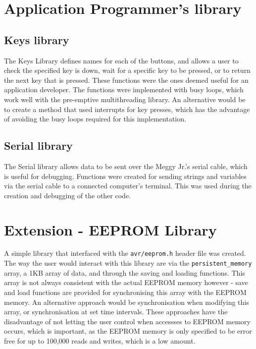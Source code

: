 \documentclass[pdftex,twoside,a4paper]{article}
\begin{document}
\section*{Application Programmer's library}
\subsection*{Keys library}
The Keys Library defines names for each of the buttons, and allows a user to check the specified key is down, wait for a specific key to be pressed, or to return the next key that is pressed. These functions were the ones deemed useful for an application developer.  The functions were implemented with busy loops, which work well with the pre-emptive multithreading library. An alternative would be to create a method that used interrupts for key presses, which has the advantage of avoiding the busy loops required for this implementation.
\subsection*{Serial library}
The Serial library allows data to be sent over the Meggy Jr.'s serial cable, which is useful for debugging. Functions were created for sending strings and variables via the serial cable to a connected computer's terminal. This was used during the creation and debugging of the other code.

\section*{Extension - EEPROM Library}
A simple library that interfaced with the \texttt{avr/eeprom.h} header file was created. The way the user would interact with this library are via the \texttt{persistent\_memory} array, a 1KB array of data, and through the saving and loading functions. This array is not always consistent with the actual EEPROM memory however - save and load functions are provided for synchronising this array with the EEPROM memory. An alternative approach would be synchronisation when modifying this array, or synchronisation at set time intervals. These approaches have the disadvantage of not letting the user control when accessses to EEPROM memory occurs, which is important, as the EEPROM memory is only specified to be error free for up to 100,000 reads and writes, which is a low amount.\\
\end{document}
